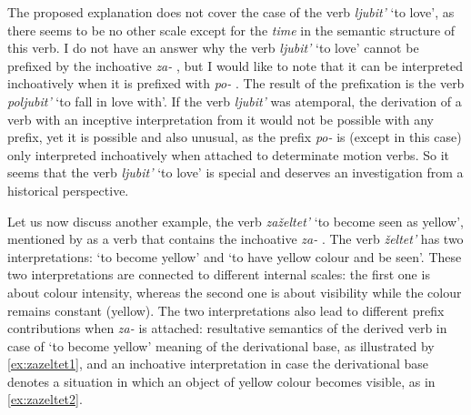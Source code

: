 The proposed explanation does not cover the case of the verb \textit{ljubit'} `to love', as there seems to be no other scale except for the \textit{time} in the semantic structure of this verb. I do not have an answer why the verb \textit{ljubit'} `to love' cannot be prefixed by the inchoative  \textit{za-}  , but I would like to note that it can be interpreted inchoatively  when it is prefixed with \textit{po-}  . The result of the prefixation  is the verb \textit{poljubit'} `to fall in love with'. If the verb \textit{ljubit'} was atemporal, the derivation of a verb with an inceptive  interpretation from it would not be possible with any prefix, yet it is possible and also unusual, as the prefix \textit{po-}   is (except in this case) only interpreted inchoatively  when attached to determinate motion verbs. So it seems that the verb \textit{ljubit'} `to love' is special and deserves an investigation from a historical perspective. 

Let us now discuss another example, the verb \textit{za\v{z}eltet'} `to become seen as yellow', mentioned by \citet{Braginsky:08} as a verb that contains the inchoative  {\textit{za-}  .} The verb \textit{\v{z}eltet'} has two interpretations: `to become yellow' and `to have yellow colour and be seen'. These two interpretations are connected to different internal scales: the first one is about colour intensity, whereas the second one is about visibility while the colour remains constant (yellow). The two interpretations also lead to different prefix contributions when \textit{za-}   is attached: resultative  semantics of the derived verb in case of `to become yellow' meaning of the derivational base, as illustrated by \ref{ex:zazeltet1}, and an inchoative  interpretation in case the derivational base denotes a  situation in which an object of yellow colour becomes visible, as in \ref{ex:zazeltet2}.


